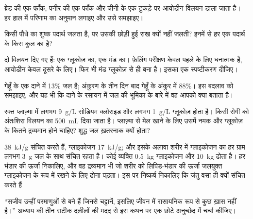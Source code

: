 \begin{exercise}[$\star\star$]\label{exo:g10:chemistry-of-life:9}
ब्रेड की एक फाँक, पनीर की एक फाँक और चीनी के एक टुकड़े पर आयोडीन विलयन
डाला जाता है। हर हाल में परिणाम का अनुमान लगाइए और उसे समझाइए।
\end{exercise}

\begin{exercise}[$\star\star$]\label{exo:g10:chemistry-of-life:10}
किसी पौधे का शुष्क पदार्थ जलता है, पर उसकी छोड़ी हुई राख क्यों नहीं
जलती? इनमें से हर एक पदार्थ के किस कुल का है?
\end{exercise}

\begin{exercise}[$\star\star$]\label{exo:g10:chemistry-of-life:11}
दो विलयन दिए गए हैं: एक ग्लूकोज़ का, एक मंड का। फ़ेलिंग परीक्षण केवल
पहले के लिए धनात्मक है, आयोडीन केवल दूसरे के लिए। फिर भी मंड ग्लूकोज़ से
ही बना है। इसका एक स्पष्टीकरण दीजिए।
\end{exercise}

\begin{exercise}[$\star\star\star$]\label{exo:g10:chemistry-of-life:12}
गेहूँ के एक दाने में 13\% जल है; अंकुरण के तीन दिन बाद गेहूँ के अंकुर
में 88\%। इस बदलाव को समझाइए, और यह भी कि दाने के रसायन में जल की भूमिका
के बारे में वह आपको क्या बताता है।
\end{exercise}

\begin{exercise}[$\star\star\star$]\label{exo:g10:chemistry-of-life:13}
रक्त प्लाज़्मा में लगभग \qty{9}{g/L} सोडियम क्लोराइड और लगभग
\qty{1}{g/L} ग्लूकोज़ होता है। किसी रोगी को अंतःशिरा विलयन का
\qty{500}{mL} दिया जाता है। प्लाज़्मा से मेल खाने के लिए उसमें नमक और
ग्लूकोज़ के कितने द्रव्यमान होने चाहिए? शुद्ध जल ख़तरनाक क्यों होता?
\end{exercise}

\begin{exercise}[$\star\star\star$]\label{exo:g10:chemistry-of-life:14}
 \qty{38}{kJ/g} संचित करते हैं, ग्लाइकोजन \qty{17}{kJ/g}; और इसके
अलावा शरीर में ग्लाइकोजन का हर ग्राम लगभग \qty{3}{g} जल के साथ संचित
रहता है। कोई व्यक्ति \qty{0.5}{kg} ग्लाइकोजन और \qty{10}{kg}  ढोता
है। हर भंडार की ऊर्जा निकालिए, और वह द्रव्यमान भी जो शरीर को लिपिड-भंडार
की ऊर्जा जलयुक्त ग्लाइकोजन के रूप में रखने के लिए ढोना पड़ता। इस पर
निष्कर्ष निकालिए कि जंतु वसा ही क्यों संचित करते हैं।
\end{exercise}

\begin{exercise}[$\star\star\star$]\label{exo:g10:chemistry-of-life:15}
``सजीव उन्हीं परमाणुओं से बने हैं जिनसे चट्टानें, इसलिए जीवन में
रासायनिक रूप से कुछ ख़ास नहीं है।'' अध्याय की तीन सटीक दलीलों की मदद से
इस कथन पर एक छोटे अनुच्छेद में चर्चा कीजिए।
\end{exercise}


